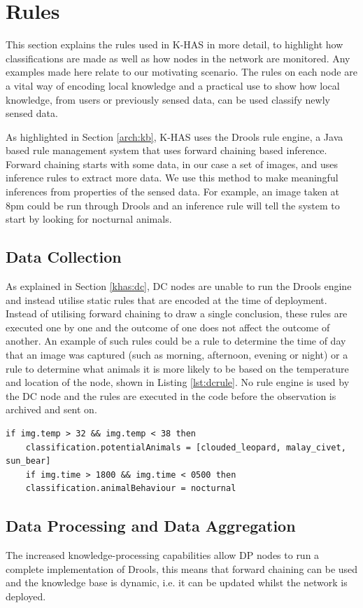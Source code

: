 	\section{Rules}
		This section explains the rules used in K-HAS in more detail, to highlight how classifications are made as well as how nodes in the network are monitored. Any examples made here relate to our motivating scenario. The rules on each node are a vital way of encoding local knowledge and a practical use to show how local knowledge, from users or previously sensed data, can be used classify newly sensed data.
		
		As highlighted in Section \ref{arch:kb}, K-HAS uses the Drools rule engine, a Java based rule management system that uses forward chaining based inference. Forward chaining starts with some data, in our case a set of images, and uses inference rules to extract more data. We use this method to make meaningful inferences from properties of the sensed data. For example, an image taken at 8pm could be run through Drools and an inference rule will tell the system to start by looking for nocturnal animals.
		
		\subsection{Data Collection}			
		As explained in Section \ref{khas:dc}, DC nodes are unable to run the Drools engine and instead utilise static rules that are encoded at the time of deployment. Instead of utilising forward chaining to draw a single conclusion, these rules are executed one by one and the outcome of one does not affect the outcome of another. An example of such rules could be a rule to determine the time of day that an image was captured (such as morning, afternoon, evening or night) or a rule to determine what animals it is more likely to be based on the temperature and location of the node, shown in Listing \ref{lst:dcrule}. No rule engine is used by the DC node and the rules are executed in the code before the observation is archived and sent on.
		
\begin{lstlisting}[caption=Encoded Data Collection Rule, label=lst:dcrule, breaklines=true]
	if img.temp > 32 && img.temp < 38 then
	classification.potentialAnimals = [clouded_leopard, malay_civet, sun_bear]
	if img.time > 1800 && img.time < 0500 then
	classification.animalBehaviour = nocturnal
\end{lstlisting}
	
	\subsection{Data Processing and Data Aggregation}
		The increased knowledge-processing capabilities allow DP nodes to run a complete implementation of Drools, this means that forward chaining can be used and the knowledge base is dynamic, i.e. it can be updated whilst the network is deployed. 
		
